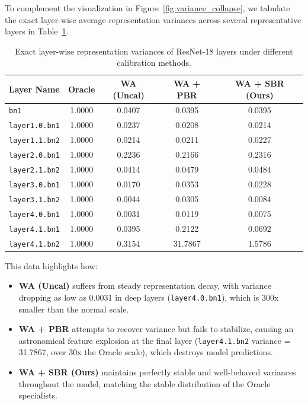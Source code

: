 \documentclass{article}
\theoremstyle{plain}
\theoremstyle{definition}
\theoremstyle{remark}
\begin{document}
To complement the visualization in Figure~\ref{fig:variance_collapse}, we tabulate the exact layer-wise average representation variances across several representative layers in Table~\ref{tab:layervar_values}.

\begin{table}[h]
\caption{Exact layer-wise representation variances of ResNet-18 layers under different calibration methods.}
\label{tab:layervar_values}
\vskip 0.15in
\begin{center}
\begin{small}
\begin{sc}
\begin{tabular}{lcccc}
\toprule
Layer Name & Oracle & WA (Uncal) & WA + PBR & WA + SBR (Ours) \\
\midrule
\texttt{bn1} & 1.0000 & 0.0407 & 0.0395 & 0.0395 \\
\texttt{layer1.0.bn1} & 1.0000 & 0.0237 & 0.0208 & 0.0214 \\
\texttt{layer1.1.bn2} & 1.0000 & 0.0214 & 0.0211 & 0.0227 \\
\texttt{layer2.0.bn1} & 1.0000 & 0.2236 & 0.2166 & 0.2316 \\
\texttt{layer2.1.bn2} & 1.0000 & 0.0414 & 0.0479 & 0.0484 \\
\texttt{layer3.0.bn1} & 1.0000 & 0.0170 & 0.0353 & 0.0228 \\
\texttt{layer3.1.bn2} & 1.0000 & 0.0044 & 0.0305 & 0.0084 \\
\texttt{layer4.0.bn1} & 1.0000 & 0.0031 & 0.0119 & 0.0075 \\
\texttt{layer4.1.bn1} & 1.0000 & 0.0395 & 0.2122 & 0.0692 \\
\texttt{layer4.1.bn2} & 1.0000 & 0.3154 & 31.7867 & 1.5786 \\
\bottomrule
\end{tabular}
\end{sc}
\end{small}
\end{center}
\vskip -0.1in
\end{table}

This data highlights how:
\begin{itemize}
    \item \textbf{WA (Uncal)} suffers from steady representation decay, with variance dropping as low as 0.0031 in deep layers (\texttt{layer4.0.bn1}), which is 300x smaller than the normal scale.
    \item \textbf{WA + PBR} attempts to recover variance but fails to stabilize, causing an astronomical feature explosion at the final layer (\texttt{layer4.1.bn2} variance = 31.7867, over 30x the Oracle scale), which destroys model predictions.
    \item \textbf{WA + SBR (Ours)} maintains perfectly stable and well-behaved variances throughout the model, matching the stable distribution of the Oracle specialists.
\end{itemize}
\end{document}
